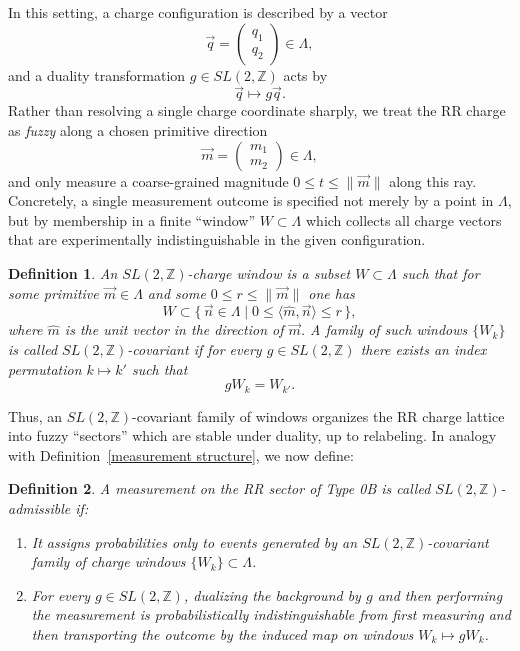 \documentclass{article}
\newtheorem{dn}{Definition}
\numberwithin{tm}{section}
\numberwithin{dn}{section}
\numberwithin{as}{section}
\numberwithin{rk}{section}
\numberwithin{lem}{section}
\numberwithin{ax}{section}
\numberwithin{pp}{section}
\numberwithin{eg}{section}
\numberwithin{war}{section}
\numberwithin{equation}{section}
\numberwithin{prop}{section}
\numberwithin{nt}{section}
\numberwithin{rc}{section}
\numberwithin{setup}{section}
\begin{document}
	In this setting, a charge configuration is described by a vector
	\[
	\vec{q} = \begin{pmatrix} q_1 \\ q_2 \end{pmatrix} \in \Lambda,
	\]
	and a duality transformation $g \in SL(2,\mathbb{Z})$ acts by
	\[
	\vec{q} \longmapsto g \vec{q}.
	\]
	Rather than resolving a single charge coordinate sharply, we treat the RR charge as \emph{fuzzy} along a chosen primitive direction
	\[
	\vec{m} = \begin{pmatrix} m_1 \\ m_2 \end{pmatrix} \in \Lambda,
	\]
	and only measure a coarse-grained magnitude $0 \leq t \leq \|\vec{m}\|$ along this ray. Concretely, a single measurement outcome is specified not merely by a point in $\Lambda$, but by membership in a finite “window” $W \subset \Lambda$ which collects all charge vectors that are experimentally indistinguishable in the given configuration.
	
	\begin{dn}
		An \emph{$SL(2,\mathbb{Z})$-charge window} is a subset $W \subset \Lambda$ such that for some primitive $\vec{m} \in \Lambda$ and some $0 \leq r \leq \|\vec{m}\|$ one has
		\[
		W \subset \{\, \vec{n} \in \Lambda \mid 0 \leq \langle \hat{m}, \vec{n} \rangle \leq r \,\},
		\]
		where $\hat{m}$ is the unit vector in the direction of $\vec{m}$. A family of such windows $\{W_k\}$ is called \emph{$SL(2,\mathbb{Z})$-covariant} if for every $g \in SL(2,\mathbb{Z})$ there exists an index permutation $k \mapsto k'$ such that
		\[
		g W_k = W_{k'}.
		\]
	\end{dn}
	
	Thus, an $SL(2,\mathbb{Z})$-covariant family of windows organizes the RR charge lattice into fuzzy “sectors” which are stable under duality, up to relabeling. In analogy with Definition~\ref{measurement structure}, we now define:
	
	\begin{dn}
		A measurement on the RR sector of Type 0B is called \emph{$SL(2,\mathbb{Z})$-admissible} if:
		\begin{enumerate}
			\item It assigns probabilities only to events generated by an $SL(2,\mathbb{Z})$-covariant family of charge windows $\{W_k\} \subset \Lambda$.
			\item For every $g \in SL(2,\mathbb{Z})$, dualizing the background by $g$ and then performing the measurement is probabilistically indistinguishable from first measuring and then transporting the outcome by the induced map on windows $W_k \mapsto g W_k$.
		\end{enumerate}
	\end{dn}
	
\end{document}
